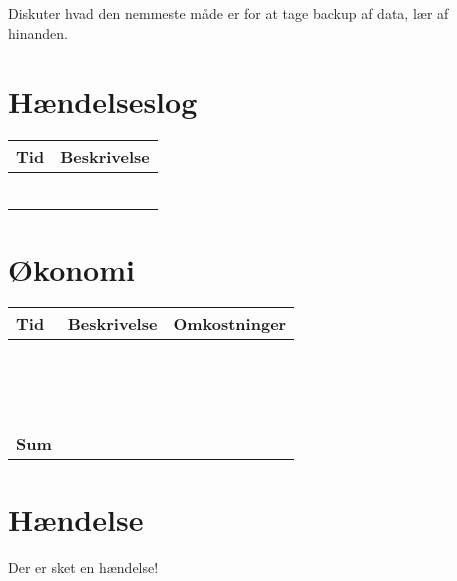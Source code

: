 \documentclass[a4paper,11pt,notitlepage,landscape]{report}
\begin{document}
Diskuter hvad den nemmeste måde er for at tage backup af data, lær af hinanden.


\eject

\section*{Hændelseslog }


\begin{tabularx}{\textwidth-1cm}{|p{3cm}|X|} \hline
Tid & Beskrivelse \\\hline
& \\\hline
& \\\hline
& \\\hline
& \\\hline
& \\\hline
& \\\hline
\end{tabularx}


\section*{Økonomi}

\begin{tabularx}{\textwidth-1cm}{|p{3cm}|X|p{3cm}|} \hline
Tid & Beskrivelse & Omkostninger \\\hline
& & \\\hline
& & \\\hline
& & \\\hline
& & \\\hline
& & \\\hline
& & \\\hline
& & \\\hline
& & \\\hline
& & \\\hline
& & \\\hline
& & \\\hline
& & \\\hline
& & \\\hline
& & \\\hline
& & \\\hline
{\bf Sum} & & \\\hline
\end{tabularx}

\eject

\section*{Hændelse }

Der er sket en hændelse!
\end{document}
